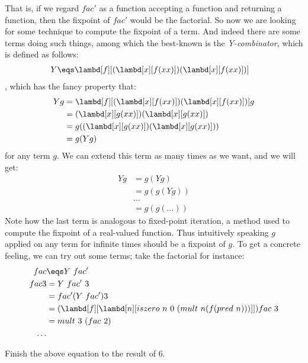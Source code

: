\documentclass[../../../include/open-logic-section]{subfiles}
\begin{document}
That is, if we regard $fac'$ as a function accepting a function and
returning a function, then the fixpoint of $fac'$ would be the
factorial. So now we are looking for some technique to compute the
fixpoint of a term. And indeed there are some terms doing such things,
among which the best-known is the \emph{Y-combinator}, which is
defined as follows:
\begin{align*}
  Y &\eqs  \lambd[f][(\lambd[x][f (x x)]) (\lambd[x][f (x x)])]
\end{align*}
, which has the fancy property that:
\begin{align*}
  Y g &= \lambd[f][(\lambd[x][f (x x)]) (\lambd[x][f (x x)])] g \\
      &= (\lambd[x][g (x x)]) (\lambd[x][g (x x)]) \\
      &= g ((\lambd[x][g (x x)]) (\lambd[x][g (x x)])) \\
      &= g (Y g)
\end{align*}
for any term $g$. We can extend this term as many times as we want,
and we will get:
\begin{align*}
    Y g &= g (Y g) \\
        &= g (g (Y g)) \\
        &\ldots \\
        &= g (g (\ldots ))
\end{align*}
Note how the last term is analogous to fixed-point iteration, a method used to
compute the fixpoint of a real-valued function. Thus intuitively
speaking $g$ applied on any term for infinite times should be a
fixpoint of $g$. To get a concrete feeling, we can try out some terms;
take the factorial for instance:
\begin{align*}
  fac &\eqs Y ~ fac'\\
  fac 3 &= Y ~ fac' ~ 3 \\
      &=fac' (Y ~ fac') 3 \\
      &=(\lambd[f][\lambd[n][iszero ~ n ~ 0 ~ (mult ~ n (f (pred ~ n)))]])
  fac ~ 3\\
      &= mult ~ 3 ~ (fac ~ 2) \\
      \ldots
\end{align*}

\begin{prob}
  Finish the above equation to the result of $6$.
\end{prob}
\end{document}
